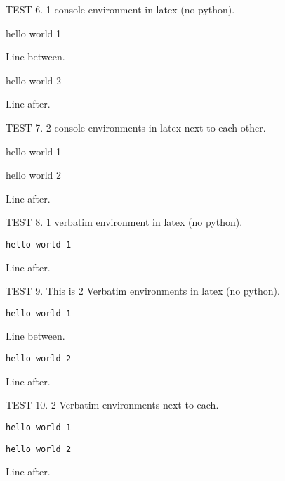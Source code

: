 TEST 6. 1 console environment in latex (no python).
\begin{console}
hello world 1
\end{console}
Line between.
\begin{console}
hello world 2
\end{console}
Line after.

TEST 7. 2 console environments in latex next to each other.
\begin{console}
hello world 1
\end{console}
\begin{console}
hello world 2
\end{console}
Line after.

TEST 8. 1 verbatim environment in latex (no python).
\begin{Verbatim}[frame=single]
hello world 1
\end{Verbatim}
Line after.

TEST 9. This is 2 Verbatim environments in latex (no python).
\begin{Verbatim}[frame=single]
hello world 1
\end{Verbatim}
Line between.
\begin{Verbatim}[frame=single]
hello world 2
\end{Verbatim}
Line after.

TEST 10. 2 Verbatim environments next to each.
\begin{Verbatim}[frame=single]
hello world 1
\end{Verbatim}
\begin{Verbatim}[frame=single]
hello world 2
\end{Verbatim}
Line after.


